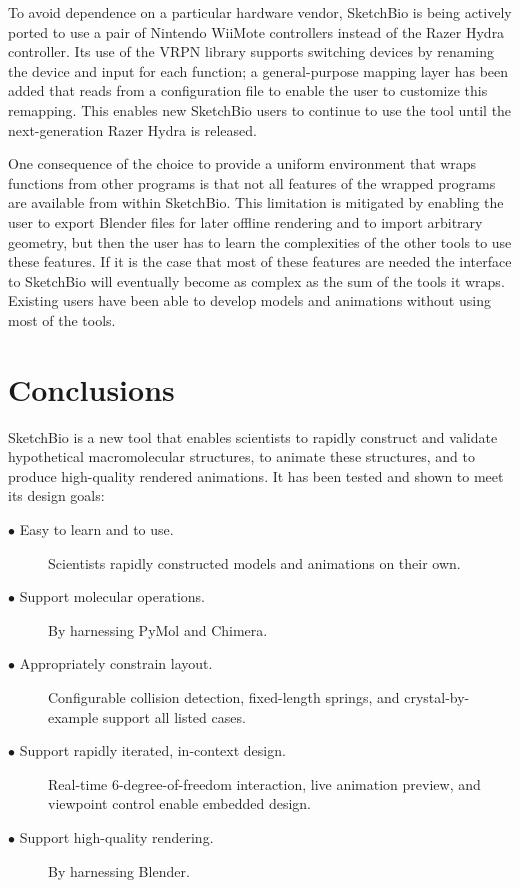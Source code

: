 \documentclass[twocolumn]{bmcart}%
\begin{document}
To avoid dependence on a particular hardware vendor, SketchBio is being actively ported to use a pair of Nintendo WiiMote controllers instead of the Razer Hydra controller.
Its use of the VRPN library supports switching devices by renaming the device and input for each function; a general-purpose mapping layer has been added that reads from a configuration file to enable the user to customize this remapping.
This enables new SketchBio users to continue to use the tool until the next-generation Razer Hydra is released.

One consequence of the choice to provide a uniform environment that wraps functions from other programs is that not all features of the wrapped programs are available from within SketchBio. This limitation is mitigated by enabling the user to export Blender files for later offline rendering and to import arbitrary geometry, but then the user has to learn the complexities of the other tools to use these features. If it is the case that most of these features are needed the interface to SketchBio will eventually become as complex as the sum of the tools it wraps. Existing users have been able to develop models and animations without using most of the tools.

\section*{Conclusions}
SketchBio is a new tool that enables scientists to rapidly construct and validate hypothetical macromolecular structures, to animate these structures, and to produce high-quality rendered animations.
It has been tested and shown to meet its design goals:
\begin{description}
  \item[$\bullet$ Easy to learn and to use.] Scientists rapidly constructed models and animations on their own.
  \item[$\bullet$ Support molecular operations.] By harnessing PyMol and Chimera.
  \item[$\bullet$ Appropriately constrain layout.] Configurable collision detection, fixed-length springs, and crystal-by-example support all listed cases.
  \item[$\bullet$ Support rapidly iterated, in-context design.] Real-time 6-degree-of-freedom interaction, live animation preview, and viewpoint control enable embedded design.
  \item[$\bullet$ Support high-quality rendering.] By harnessing Blender.
\end{description}
\end{document}
